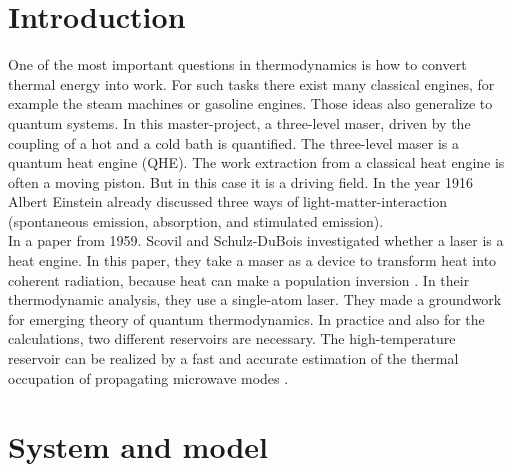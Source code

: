 \documentclass[12pt,a4paper]{article}
\begin{document}
\section{Introduction}
One of the most important questions in thermodynamics is how to convert
thermal energy into work. For such tasks there exist many classical engines, for
example the steam machines or gasoline engines. %
Those ideas also generalize to quantum systems.
In this master-project, a three-level maser, driven by the coupling of a hot and a cold bath is quantified.
The three-level maser is a quantum heat engine (QHE). The work extraction from a classical heat engine is often a moving piston. But in this case
it is a driving field. In the year 1916 Albert Einstein already discussed three ways of
light-matter-interaction (spontaneous emission, absorption, and stimulated
emission)\cite{Li2017}. \\In a paper from 1959.  Scovil and Schulz-DuBois \cite{Scovil1959} investigated whether a laser is a heat engine. In this paper, they take a maser as a device to transform heat into coherent radiation, because heat can make a population inversion .
In their thermodynamic analysis, they use a single-atom laser. They made a
groundwork for emerging theory of quantum thermodynamics. In practice and also for the calculations, two different reservoirs are necessary. The high-temperature reservoir can be
realized by a fast and accurate
estimation of the thermal occupation of propagating microwave modes  \cite{Scigliuzzo2020}.

\newpage

\section{System and model}
\end{document}
